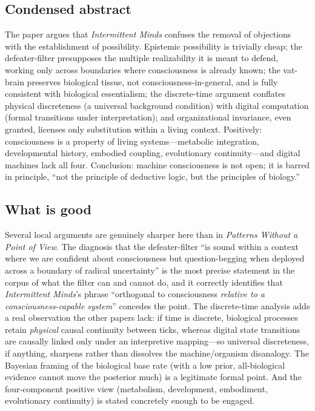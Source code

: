 \documentclass[11pt]{article}
\newcommand{\IM}{\emph{Intermittent Minds}}
\newcommand{\PP}{\emph{Patterns Without a Point of View}}
\begin{document}
\subsection{Condensed abstract}
The paper argues that \IM{} confuses the removal of objections with the establishment of possibility. Epistemic possibility is trivially cheap; the defeater-filter presupposes the multiple realizability it is meant to defend, working only across boundaries where consciousness is already known; the vat-brain preserves biological tissue, not consciousness-in-general, and is fully consistent with biological essentialism; the discrete-time argument conflates physical discreteness (a universal background condition) with digital computation (formal transitions under interpretation); and organizational invariance, even granted, licenses only substitution within a living context. Positively: consciousness is a property of living systems---metabolic integration, developmental history, embodied coupling, evolutionary continuity---and digital machines lack all four. Conclusion: machine consciousness is not open; it is barred in principle, ``not the principle of deductive logic, but the principles of biology.''

\subsection{What is good}
Several local arguments are genuinely sharper here than in \PP{}. The diagnosis that the defeater-filter ``is sound within a context where we are confident about consciousness but question-begging when deployed across a boundary of radical uncertainty'' is the most precise statement in the corpus of what the filter can and cannot do, and it correctly identifies that \IM{}'s phrase ``orthogonal to consciousness \emph{relative to a consciousness-capable system}'' concedes the point. The discrete-time analysis adds a real observation the other papers lack: if time is discrete, biological processes retain \emph{physical} causal continuity between ticks, whereas digital state transitions are causally linked only under an interpretive mapping---so universal discreteness, if anything, sharpens rather than dissolves the machine/organism disanalogy. The Bayesian framing of the biological base rate (with a low prior, all-biological evidence cannot move the posterior much) is a legitimate formal point. And the four-component positive view (metabolism, development, embodiment, evolutionary continuity) is stated concretely enough to be engaged.
\end{document}
